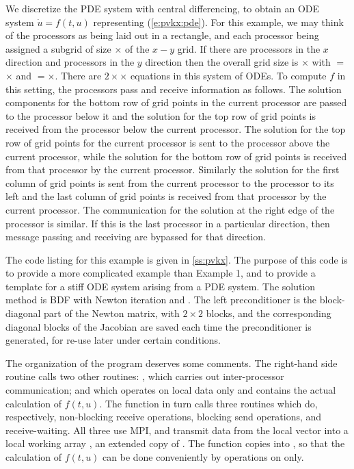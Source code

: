 We discretize the PDE system with central differencing, to obtain
an ODE system $\dot{u} = f(t,u)$ representing (\ref{e:pvkx:pde}). For this
example, we may think of the processors as being laid out in a rectangle,
and each processor being assigned a subgrid of size $\times$ of
the $x-y$ grid. If there are  processors in the $x$ direction and 
processors in the $y$ direction then the overall grid size is $\times$
with $=$$\times$ and $=$$\times$.
There are $2\times$$\times$ equations in this system of ODEs. 
To compute $f$ in this setting, the processors pass and receive information as follows. 
The solution components for the bottom row of grid points in the current
processor are passed to the processor below it and the solution for the top
row of grid points is received from the processor below the current
processor. The solution for the top row of grid points for the current
processor is sent to the processor above the current processor, while the
solution for the bottom row of grid points is received from that processor
by the current processor. Similarly the solution for the first column of
grid points is sent from the current processor to the processor to its left
and the last column of grid points is received from that processor by the
current processor. The communication for the solution at the right edge of
the processor is similar. If this is the last processor in a particular
direction, then message passing and receiving are bypassed for that
direction.

The code listing for this example is given in \A\ref{ss:pvkx}. The purpose of this
code is to provide a more complicated example than Example 1, and to provide
a template for a stiff ODE system arising from a PDE system. The solution
method is BDF with Newton iteration and {\spgmr}. The left preconditioner is
the block-diagonal part of the Newton matrix, with $2 \times 2$ blocks, and
the corresponding diagonal blocks of the Jacobian are saved each time the
preconditioner is generated, for re-use later under certain conditions. 

The organization of the  program deserves some comments. The
right-hand side routine  calls two other routines: , which
carries out inter-processor communication; and  which operates on
local data only and contains the actual calculation of $f(t,u)$. The 
 function in turn calls three routines which do, respectively,
non-blocking receive operations, blocking send operations, and
receive-waiting. All three use MPI, and transmit data from the local 
vector into a local working array , an extended copy of .
The  function copies  into , so that the
calculation of $f(t,u)$ can be done conveniently by operations on 
 only.

